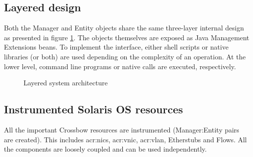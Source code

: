 \documentclass[11pt]{book}
\begin{document}
      \subsection{Layered design}

        Both the Manager and Entity objects share the same three-layer internal design as presented in figure
        \ref{fig:arch:laydes}. The objects themselves are exposed as Java Management Extensions beans. To implement the
        interface, either shell scripts or native libraries (or both) are used depending on the complexity of an
        operation. At the lower level, command line programs or native calls are executed, respectively.

        \begin{figure}[H]
          \begin{center}
          \end{center}

          \caption{Layered system architecture}
          \label{fig:arch:laydes}
        \end{figure}


      \subsection{Instrumented Solaris OS resources}

        All the important Crossbow resources are instrumented (Manager:Entity pairs are created). This includes
        \gls{acr:nic}s, \gls{acr:vnic}, \gls{acr:vlan}, Etherstubs and Flows.  All the components are loosely coupled
        and can be used independently.
\end{document}
